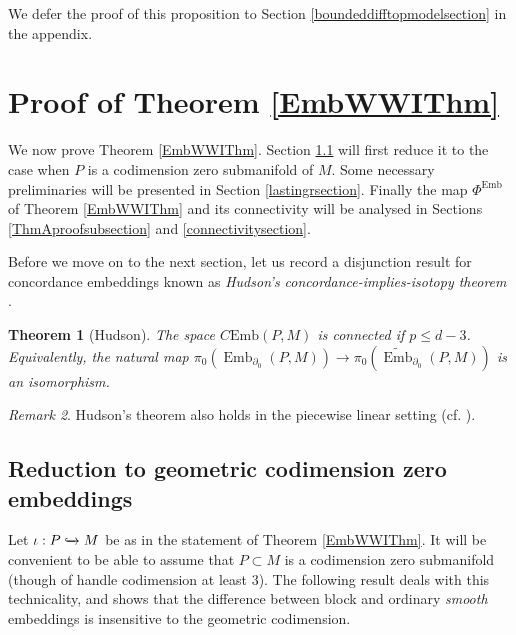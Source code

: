 \documentclass[a4paper, oneside]{amsart}
\newcommand{\emb}{\operatorname{Emb}}
\newcommand{\bemb}{\widetilde{\operatorname{Emb}}}
\newcommand{\cemb}{C\mathrm{Emb}}
\newcommand{\1}{\mathds{1}}
\newtheorem{thm}{Theorem}[section]%
\theoremstyle{remark}
\newtheorem{rem}[thm]{Remark}%
\theoremstyle{definition}
\numberwithin{equation}{section}
\begin{document}
We defer the proof of this proposition to Section \ref{boundeddifftopmodelsection} in the appendix.












\section{Proof of Theorem \ref{EmbWWIThm}}\label{section4}
We now prove Theorem \ref{EmbWWIThm}. Section \ref{codimensionsection} will first reduce it to the case when $P$ is a codimension zero submanifold of $M$. Some necessary preliminaries will be presented in Section \ref{lastingrsection}. Finally the map $\Phi^{\emb}$ of Theorem \ref{EmbWWIThm} and its connectivity will be analysed in Sections \ref{ThmAproofsubsection} and \ref{connectivitysection}.


Before we move on to the next section, let us record a disjunction result for concordance embeddings known as \textit{Hudson's concordance-implies-isotopy theorem} \cite[Thm. 2.1, Addendum 2.1.2]{Hudson}. 
\begin{thm}[Hudson]\label{Hudsonstheorem}
    The space $\cemb(P,M)$ is connected if $p\leq d-3$. Equivalently, the natural map $\pi_0(\emb_{\partial_0}(P,M))\to \pi_0(\bemb_{\partial_0}(P,M))$ is an isomorphism.
\end{thm}

\begin{rem}\label{HudsonTopRem}
    Hudson's theorem also holds in the piecewise linear setting (cf. \cite[Thm. 1.5]{Hudson}).
\end{rem}








\subsection{Reduction to geometric codimension zero embeddings} \label{codimensionsection}
Let $\iota: P\xhookrightarrow{}M$ be as in the statement of Theorem \ref{EmbWWIThm}. It will be convenient to be able to assume that $P\subset M$ is a codimension zero submanifold (though of handle codimension at least $3$). The following result deals with this technicality, and shows that the difference between block and ordinary \emph{smooth} embeddings is insensitive to the geometric codimension.
\end{document}
